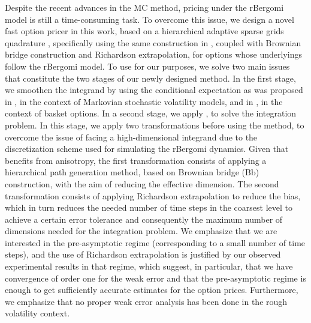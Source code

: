 Despite the recent advances in the MC method, pricing under the rBergomi model is still a time-consuming task. To overcome this issue,  we design  a novel fast option pricer in this work,  based on a  hierarchical adaptive sparse grids quadrature , specifically using the same construction in \cite{haji2016multi}, coupled with Brownian bridge construction and Richardson extrapolation, for options whose underlyings  follow the rBergomi model.  To use  for our purposes, we  solve two main issues that constitute the two stages of our newly designed method. In the first stage, we smoothen the integrand by using the conditional expectation as was proposed in \cite{romano1997contingent}, in the context of Markovian stochastic volatility  models, and in \cite{bayersmoothing}, in the context of basket options.   In a second stage, we apply  , to solve the integration problem. In this stage, we apply two transformations before using the  method, to overcome the issue of facing a high-dimensional integrand due to the discretization scheme used for simulating the rBergomi dynamics. Given that  benefits from anisotropy, the first transformation consists of applying a hierarchical  path generation method, based on Brownian
bridge (Bb) construction, with the aim of reducing the effective dimension. The second transformation consists of applying Richardson extrapolation to reduce the bias, which in turn reduces the needed number of time steps in the coarsest level to achieve a certain error tolerance and consequently  the maximum number of dimensions needed for the integration problem. We emphasize that we are interested in  the pre-asymptotic regime (corresponding to a small number of time steps), and the use of Richardson extrapolation is justified by our observed experimental results in that regime,  which suggest, in particular, that we have convergence of order one for the weak error and  that the pre-asymptotic regime is enough to get sufficiently accurate estimates for the option prices. Furthermore, we emphasize that no proper weak error analysis has been done in the rough volatility context.

